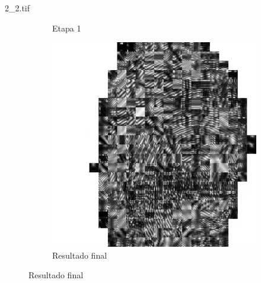 \documentclass{beamer}
\begin{document}
\begin{frame}{2\_2.tif}
\begin{figure}
\begin{subfigure}[!ht]{0.32\textwidth}
                \caption{Etapa 1}
            \end{subfigure}
            \begin{subfigure}[!ht]{0.32\textwidth}
                \includegraphics[width=\columnwidth]{Fingerprints/2_2_final.jpg}
                \caption{Resultado final}
            \end{subfigure}
        \end{figure}
    \end{frame}
\end{document}
